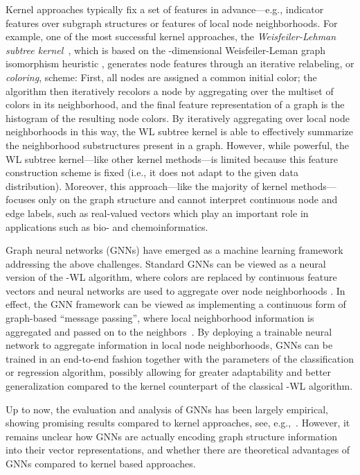 \documentclass[letterpaper]{article}
\theoremstyle{definition}
\newcommand{\new}[1]{\emph{#1}}
\begin{document}
Kernel approaches typically fix a set of features in advance---e.g., indicator features over subgraph structures or features of local node neighborhoods.
For example, one of the most successful kernel approaches, the \new{Weisfeiler-Lehman subtree kernel}~\cite{She+2011}, which is based on the -dimensional Weisfeiler-Leman graph isomorphism heuristic \cite[pp.\,79\,ff.]{Gro2017}, generates node features through an iterative relabeling, or \emph{coloring}, scheme: 
First, all nodes are assigned a common initial color; the algorithm then iteratively recolors a node by aggregating over the multiset of colors in its neighborhood, and the final feature representation of a graph is the histogram of the resulting node colors.  
By iteratively aggregating over local node neighborhoods in this way, the WL subtree kernel is able to effectively summarize the neighborhood substructures present in a graph. 
However, while powerful, the WL subtree kernel---like other kernel methods---is limited because this feature construction scheme is fixed (i.e., it does not adapt to the given data distribution). Moreover, this approach---like the majority of kernel methods---focuses only on the graph structure and cannot interpret continuous node and edge labels, such as real-valued vectors which play an important role in applications such as bio- and chemoinformatics. 
 
Graph neural networks (GNNs) have emerged as a machine learning framework addressing the above challenges.
Standard GNNs can be viewed as a neural version of the -WL algorithm, where colors are replaced by continuous feature vectors and neural networks are used to aggregate over node neighborhoods \cite{Ham+2017,Kip+2017}. 
In effect, the GNN framework can be viewed as implementing a continuous form of graph-based ``message passing'', where local neighborhood information is aggregated and passed on to the neighbors~\cite{Gil+2017}. By deploying a trainable neural network to aggregate information in local node neighborhoods, GNNs can be trained in an end-to-end fashion together with the parameters of the classification or regression algorithm, possibly allowing for greater adaptability and better generalization 
compared to the kernel counterpart of the classical -WL algorithm. 

Up to now, the evaluation and analysis of GNNs has been largely empirical, showing promising results compared to kernel approaches, see, e.g.,~\cite{Yin+2018}. However, it remains unclear how GNNs are actually encoding graph structure information into their vector representations, and whether there are theoretical advantages of GNNs compared to kernel based approaches. 
\end{document}
